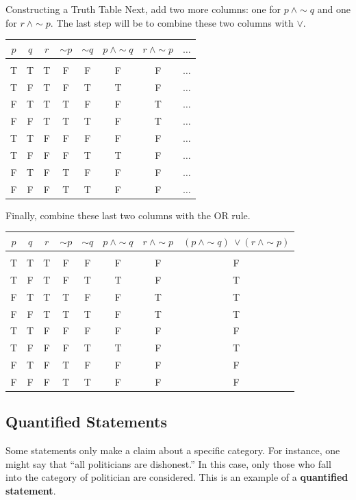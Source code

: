 \begin{example}[https://www.youtube.com/watch?v=Sdh658OUmFk]{Constructing a Truth Table}
Next, add two more columns: one for $p\ \wedge \sim q$ and one for $r\ \wedge \sim p$.  The last step will be to combine these two columns with $\vee$.
\begin{center}
\begin{tabular}{|c c c c c c c c|}
\hline
$p$ & $q$ & $r$ & $\sim p$ & $\sim q$ & $p\ \wedge \sim q$ & $r\ \wedge \sim p$ & $\ldots$\\
\hline
& & & & & & &\\
T & T & T & F & F & F & F & $\ldots$\\
T & F & T & F & T & T & F & $\ldots$\\
F & T & T & T & F & F & T & $\ldots$\\
F & F & T & T & T & F & T & $\ldots$\\
T & T & F & F & F & F & F & $\ldots$\\
T & F & F & F & T & T & F & $\ldots$\\
F & T & F & T & F & F & F & $\ldots$\\
F & F & F & T & T & F & F & $\ldots$\\
\hline
\end{tabular}
\end{center}

Finally, combine these last two columns with the OR rule.
\begin{center}
{\color{green!30!black}
\begin{tabular}{|c c c c c c c c|}
\hline
$p$ & $q$ & $r$ & $\sim p$ & $\sim q$ & $p\ \wedge \sim q$ & $r\ \wedge \sim p$ & $(p\ \wedge \sim q)\ \vee (r\ \wedge \sim p)$\\
\hline
& & & & & & &\\
T & T & T & F & F & F & F & F\\
T & F & T & F & T & T & F & T\\
F & T & T & T & F & F & T & T\\
F & F & T & T & T & F & T & T\\
T & T & F & F & F & F & F & F\\
T & F & F & F & T & T & F & T\\
F & T & F & T & F & F & F & F\\
F & F & F & T & T & F & F & F\\
\hline
\end{tabular}}
\end{center}
\end{example}

\subsection{Quantified Statements}
Some statements only make a claim about a specific category.  For instance, one might say that ``all politicians are dishonest.''  In this case, only those who fall into the category of politician are considered.  This is an example of a \textbf{quantified statement}. 

